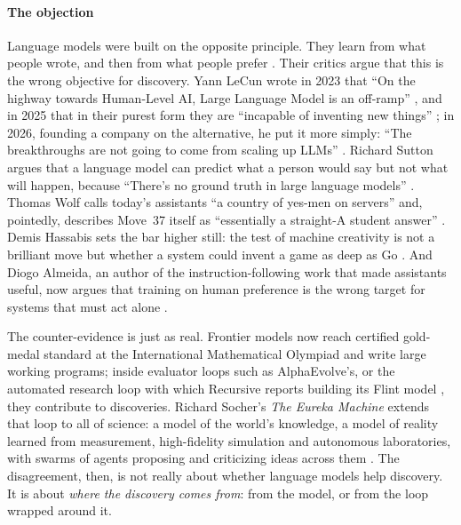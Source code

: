 \paragraph{The objection} Language models were built on the opposite principle. They learn from
what people wrote, and then from what people prefer \citep{ouyang2022instructgpt}. Their critics
argue that this is the wrong objective for discovery. Yann LeCun wrote in 2023 that ``On the
highway towards Human-Level AI, Large Language Model is an off-ramp'' \citep{lecun2023offramp},
and in 2025 that in their purest form they are ``incapable of inventing new things''
\citep{lecun2025bigtech}; in 2026, founding a company on the alternative, he put it more simply:
``The breakthroughs are not going to come from scaling up LLMs'' \citep{lecun2026mittr}. Richard
Sutton argues that a language model can predict what a person would say but not what will happen,
because ``There's no ground truth in large language models'' \citep{sutton2025dwarkesh}. Thomas
Wolf calls today's assistants ``a country of yes-men on servers'' and, pointedly, describes Move~37
itself as ``essentially a straight-A student answer'' \citep{wolf2025einstein}. Demis Hassabis sets
the bar higher still: the test of machine creativity is not a brilliant move but whether a system
could invent a game as deep as Go \citep{hassabis2025bigtech,mccracken2026alphago}. And Diogo
Almeida, an author of the instruction-following work that made assistants useful, now argues that
training on human preference is the wrong target for systems that must act alone
\citep{almeida2026aie,typesafe2026jev}.

The counter-evidence is just as real. Frontier models now reach certified gold-medal standard at the
International Mathematical Olympiad \citep{deepmind2025imo} and write large working programs; inside
evaluator loops such as AlphaEvolve's, or the automated research loop with which Recursive reports
building its Flint model \citep{recursive2026flint}, they contribute to discoveries. Richard Socher's
\emph{The Eureka Machine} \citep{socher2026eureka} extends that loop to all of science: a model of
the world's knowledge, a model of reality learned from measurement, high-fidelity simulation and
autonomous laboratories, with swarms of agents proposing and criticizing ideas across them
\citep{socher2026bookbite}. The disagreement, then, is not really about whether language models help
discovery. It is about \emph{where the discovery comes from}: from the model, or from the loop
wrapped around it.

